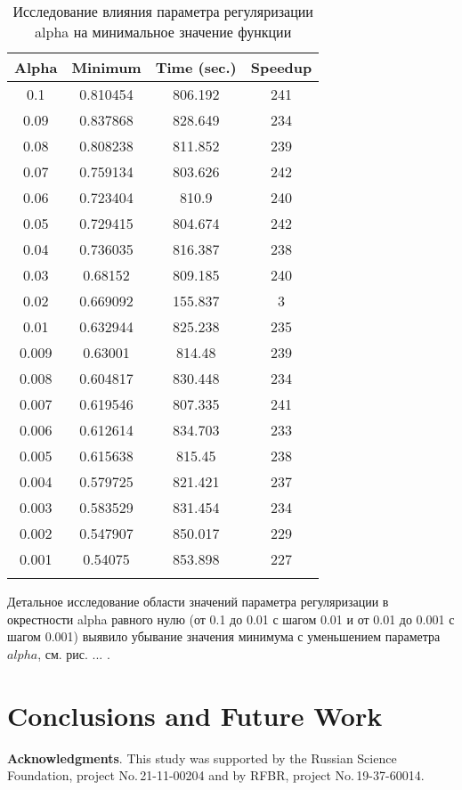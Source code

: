\documentclass{svproc}
\begin{document}
\begin{table}
\caption{Исследование влияния параметра регуляризации alpha на минимальное значение функции}
\label{table_1}
\begin{center}
\begin{tabular}{cccc}
\hline\noalign{\smallskip}
 Alpha      & Minimum  & Time (sec.) & Speedup \\
\hline\noalign{\smallskip}
0.1		&	0.810454	&	806.192	&	241       \\
0.09	&	0.837868	&	828.649	&	234       \\
0.08	&	0.808238	&	811.852	&	239       \\
0.07	&	0.759134	&	803.626	&	242       \\
0.06	&	0.723404	&	810.9	&	240       \\
0.05	&	0.729415	&	804.674	&	242       \\
0.04	&	0.736035	&	816.387	&	238       \\
0.03	&	0.68152		&	809.185	&	240       \\
0.02	&	0.669092	&	155.837	&	3         \\
0.01	&	0.632944	&	825.238	&	235       \\
0.009	&	0.63001		&	814.48	&	239       \\
0.008	&	0.604817	&	830.448	&	234       \\
0.007	&	0.619546	&	807.335	&	241       \\
0.006	&	0.612614	&	834.703	&	233       \\
0.005	&	0.615638	&	815.45	&	238       \\
0.004	&	0.579725	&	821.421	&	237       \\
0.003	&	0.583529	&	831.454	&	234       \\
0.002	&	0.547907	&	850.017	&	229       \\
0.001	&	0.54075		&	853.898	&	227       \\
\noalign{\smallskip}\hline
\end{tabular}\end{center}\end{table}

Детальное исследование области значений параметра регуляризации в окрестности alpha равного нулю (от 0.1 до 0.01 с шагом 0.01 и от 0.01 до 0.001 с шагом 0.001) выявило убывание значения минимума с уменьшением параметра $alpha$, см. рис. ... .

\section{Conclusions and Future Work}



\medskip

\textbf{Acknowledgments}. This study was supported by the Russian Science Foundation, project No.\,21-11-00204 and by RFBR, project No.\,19-37-60014.

%
%

{}
\end{document}

